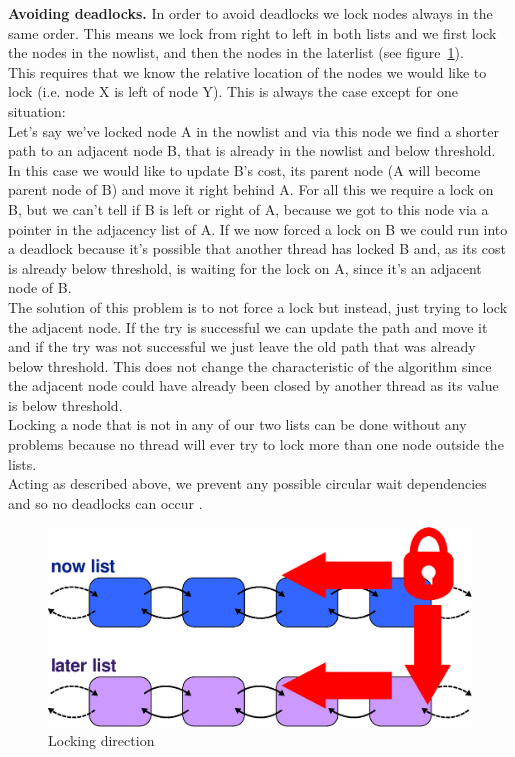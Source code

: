 \documentclass[letterpaper]{article}
\newcommand{\mypar}[1]{{\bf #1.}}
\begin{document}
\mypar{Avoiding deadlocks}
In order to avoid deadlocks we lock nodes always in the same order. This means we lock from right to left in both lists and we first lock the nodes in the nowlist, and then the nodes in the laterlist (see figure~\ref{fig:lock}).\\
This requires that we know the relative location of the nodes we would like to lock (i.e. node X is left of node Y). This is always the case except for one situation:\\
Let's say we've locked node A in the nowlist and via this node we find a shorter path to an adjacent node B, that is already in the nowlist and below threshold. In this case we would like to update B's cost, its parent node (A will become parent node of B) and move it right behind A. For all this we require a lock on B, but we can't tell if B is left or right of A, because we got to this node via a pointer in the adjacency list of A. If we now forced a lock on B we could run into a deadlock because it's possible that another thread has locked B and, as its cost is already below threshold, is waiting for the lock on A, since it's an adjacent node of B.\\
The solution of this problem is to not force a lock but instead, just trying to lock the adjacent node. If the try is successful we can update the path and move it and if the try was not successful we just leave the old path that was already below threshold. This does not change the characteristic of the algorithm since the adjacent node could have already been closed by another thread as its value is below threshold. \\
Locking a node that is not in any of our two lists can be done without any problems because no thread will ever try to lock more than one node outside the lists.\\
Acting as described above, we prevent any possible circular wait dependencies and so no deadlocks can occur \cite{Coffman:71}.

\begin{figure}[h]\centering
  \includegraphics[scale=0.38]{locking.eps}
  \caption{Locking direction \label{fig:lock}}
\end{figure}
\end{document}
